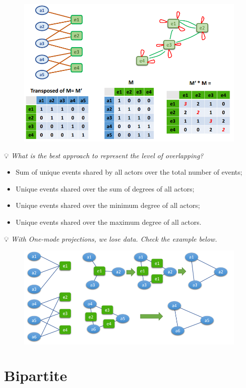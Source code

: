\documentclass[
  notitlepage,
  onecolumn,
  openany]{book}
\providecommand{\tightlist}{%
  \setlength{\itemsep}{0pt}\setlength{\parskip}{0pt}}
\begin{document}
\begin{figure}[h!]

{\centering \includegraphics[width=0.5\linewidth]{images/10-Two mode networks/Untitled} 

}

\end{figure}

💡 \emph{What is the best approach to represent the level of overlapping?}

\begin{itemize}
\tightlist
\item
  Sum of unique events shared by all actors over the total number of events;
\item
  Unique events shared over the sum of degrees of all actors;
\item
  Unique events shared over the minimum degree of all actors;
\item
  Unique events shared over the maximum degree of all actors.
\end{itemize}

💡 \emph{With One-mode projections, we lose data. Check the example below.}

\begin{figure}[h!]

{\centering \includegraphics[width=0.5\linewidth]{images/10-Two mode networks/Untitled 1} 

}

\end{figure}

\hypertarget{bipartite}{%
\section{Bipartite}\label{bipartite}}
\end{document}
